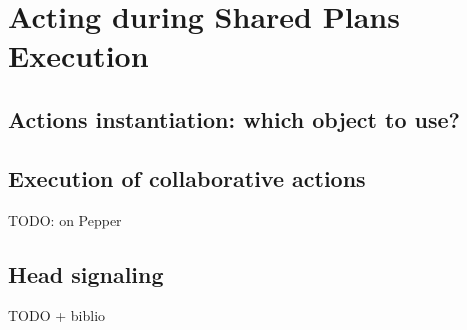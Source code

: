 \documentclass[english,a4paper,11pt,twoside]{StyleThese}
\begin{document}
\setcounter{chapter}{4} %
\dominitoc
\faketableofcontents
\fi

\chapter{Acting during Shared Plans Execution}
\minitoc

\label{ch:Acting}

\section{Actions instantiation: which object to use?}

\section{Execution of collaborative actions}

TODO: on Pepper

\section{Head signaling}

TODO + biblio


\ifdefined{}
\else


\end{document}
